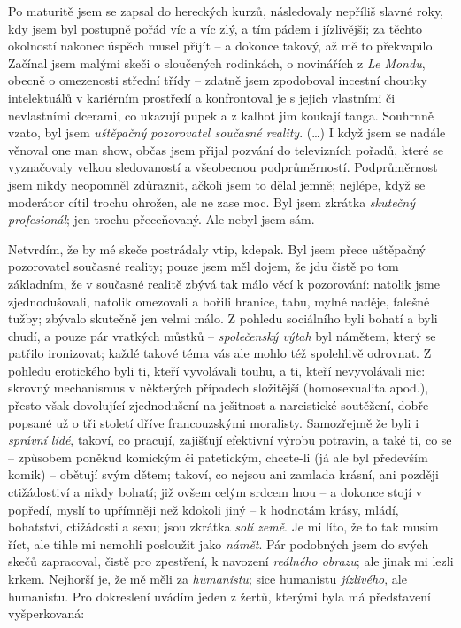 Po maturitě jsem se zapsal do hereckých kurzů, následovaly nepříliš slavné roky, kdy jsem byl postupně pořád víc a víc zlý, a tím pádem i jízlivější; za těchto okolností nakonec úspěch musel přijít – a dokonce takový, až mě to překvapilo. Začínal jsem malými skeči o sloučených rodinkách, o novinářích z \textit{Le Mondu}, obecně o omezenosti střední třídy – zdatně jsem zpodoboval incestní choutky intelektuálů v kariérním prostředí a konfrontoval je s jejich vlastními či nevlastními dcerami, co ukazují pupek a z kalhot jim koukají tanga. Souhrnně vzato, byl jsem  \textit{uštěpačný pozorovatel současné reality}. (…) I když jsem se nadále věnoval  one man show, občas jsem přijal pozvání do televizních pořadů, které se vyznačovaly velkou sledovaností a všeobecnou podprůměrností. Podprůměrnost jsem nikdy neopomněl zdůraznit, ačkoli jsem to dělal jemně; nejlépe, když se moderátor cítil trochu ohrožen, ale ne zase moc. Byl jsem zkrátka  \textit{skutečný profesionál}; jen trochu přeceňovaný. Ale nebyl jsem sám.

Netvrdím, že by mé skeče postrádaly vtip, kdepak. Byl jsem přece uštěpačný pozorovatel současné reality; pouze jsem měl dojem, že jdu čistě po tom základním, že v současné realitě zbývá tak málo věcí k pozorování: natolik jsme zjednodušovali, natolik omezovali a bořili hranice, tabu, mylné naděje, falešné tužby; zbývalo skutečně jen velmi málo. Z pohledu sociálního byli bohatí a byli chudí, a pouze pár vratkých můstků –  \textit{společenský výtah} byl námětem, který se patřilo ironizovat; každé takové téma vás ale mohlo též spolehlivě odrovnat. Z pohledu erotického byli ti, kteří vyvolávali touhu, a ti, kteří nevyvolávali nic: skrovný mechanismus v některých případech složitější (homosexualita apod.), přesto však dovolující zjednodušení na ješitnost a narcistické soutěžení, dobře popsané už o tři století dříve francouzskými moralisty. Samozřejmě že byli i  \textit{správní lidé}, takoví, co pracují, zajišťují efektivní výrobu potravin, a také ti, co se – způsobem poněkud komickým či patetickým, chcete-li (já ale byl především komik) – obětují svým dětem; takoví, co nejsou ani zamlada krásní, ani později ctižádostiví a nikdy bohatí; již ovšem celým srdcem lnou – a dokonce stojí v popředí, myslí to upřímněji než kdokoli jiný – k hodnotám krásy, mládí, bohatství, ctižádosti a sexu; jsou zkrátka  \textit{solí země}. Je mi líto, že to tak musím říct, ale tihle mi nemohli posloužit jako  \textit{námět}. Pár podobných jsem do svých skečů zapracoval, čistě pro zpestření, k navození  \textit{reálného obrazu}; ale jinak mi lezli krkem. Nejhorší je, že mě měli za \textit{humanistu}; sice humanistu  \textit{jízlivého}, ale humanistu. Pro dokreslení uvádím jeden z žertů, kterými byla má představení vyšperkovaná:



